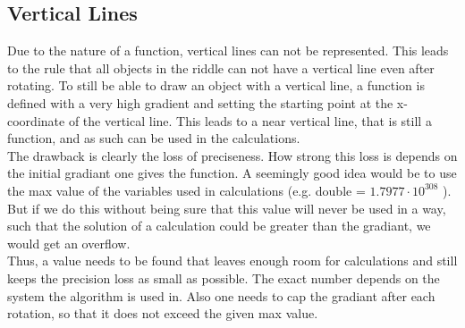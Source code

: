 \subsection{Vertical Lines}
Due to the nature of a function, vertical lines can not be represented. This leads to the rule that all objects in the riddle can not have a vertical line even after rotating. 
To still be able to draw an object with a vertical line, a function is defined with a very high gradient and setting the starting point at the x-coordinate of the vertical line. This leads to a near vertical line, that is still a function, and as such can be used in the calculations.\\
The drawback is clearly the loss of preciseness. How strong this loss is depends on the initial gradiant one gives the function. A seemingly good idea would be to use the max value of the variables used in calculations (e.g. double = $1.7977 \cdot 10^{308}$ ). But if we do this without being sure that this value will never be used in a way, such that the solution of a calculation could be greater than the gradiant, we would get an overflow.\\
Thus, a value needs to be found that leaves enough room for calculations and still keeps the precision loss as small as possible. The exact number depends on the system the algorithm is used in. Also one needs to cap the gradiant after each rotation, so that it does not exceed the given max value.



